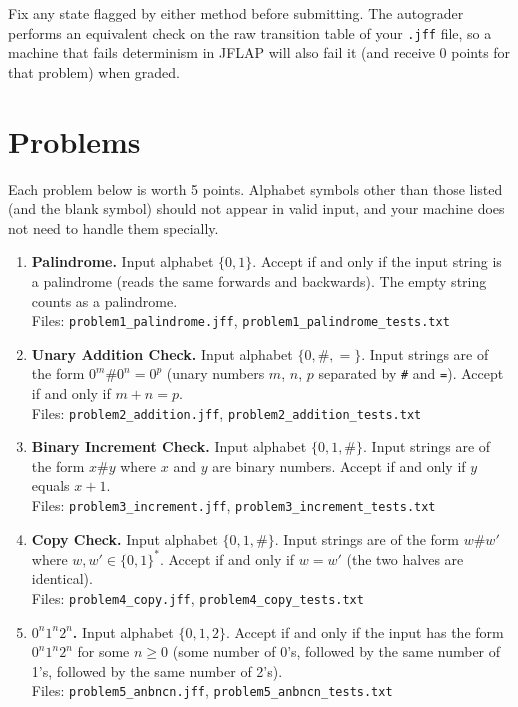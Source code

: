 \documentclass[11pt]{article}
\begin{document}
Fix any state flagged by either method before submitting. The autograder
performs an equivalent check on the raw transition table of your
\texttt{.jff} file, so a machine that fails determinism in JFLAP will
also fail it (and receive 0 points for that problem) when graded.

\section*{Problems}

Each problem below is worth 5 points. Alphabet symbols other than those
listed (and the blank symbol) should not appear in valid input, and your
machine does not need to handle them specially.

\begin{enumerate}

\item \textbf{Palindrome.} Input alphabet $\{0,1\}$. Accept if and only if
the input string is a palindrome (reads the same forwards and backwards).
The empty string counts as a palindrome.
\\ Files: \texttt{problem1\_palindrome.jff}, \texttt{problem1\_palindrome\_tests.txt}

\item \textbf{Unary Addition Check.} Input alphabet $\{0, \#, =\}$. Input
strings are of the form $0^m \# 0^n = 0^p$ (unary numbers $m$, $n$, $p$
separated by \texttt{\#} and \texttt{=}). Accept if and only if $m + n =
p$.
\\ Files: \texttt{problem2\_addition.jff}, \texttt{problem2\_addition\_tests.txt}

\item \textbf{Binary Increment Check.} Input alphabet $\{0, 1, \#\}$.
Input strings are of the form $x \# y$ where $x$ and $y$ are binary
numbers. Accept if and only if $y$ equals $x + 1$.
\\ Files: \texttt{problem3\_increment.jff}, \texttt{problem3\_increment\_tests.txt}

\item \textbf{Copy Check.} Input alphabet $\{0, 1, \#\}$. Input strings
are of the form $w \# w'$ where $w, w' \in \{0,1\}^*$. Accept if and only
if $w = w'$ (the two halves are identical).
\\ Files: \texttt{problem4\_copy.jff}, \texttt{problem4\_copy\_tests.txt}

\item \textbf{$0^n1^n2^n$.} Input alphabet $\{0, 1, 2\}$. Accept if and
only if the input has the form $0^n 1^n 2^n$ for some $n \geq 0$ (some
number of 0's, followed by the same number of 1's, followed by the same
number of 2's).
\\ Files: \texttt{problem5\_anbncn.jff}, \texttt{problem5\_anbncn\_tests.txt}

\end{enumerate}
\end{document}

